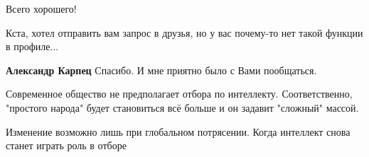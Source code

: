 \begin{itemize}
\begin{itemize}
Всего хорошего!

Кста, хотел отправить вам запрос в друзья, но у вас почему-то нет такой функции
в профиле...

\textbf{Александр Карпец} Спасибо. И мне приятно было с Вами пообщаться.

\end{itemize} %


Современное общество не предполагает отбора по интеллекту. Соответственно,
"простого народа" будет становиться всё больше и он задавит "сложный" массой.

Изменение возможно лишь при глобальном потрясении. Когда интеллект снова станет
играть роль в отборе

\end{itemize} %
